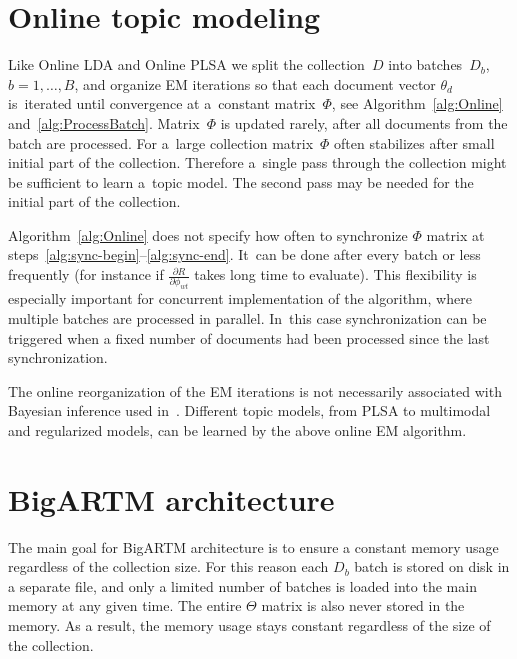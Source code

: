 \documentclass{sig-alternate}
\begin{document}
\section{Online topic modeling}
\label{sec:Online}

Like Online LDA \cite{hoffman10online} and Online PLSA \cite{bassiou14online}
we split the collection~$D$ into batches~$D_b$, ${b=1,\dots,B}$,
and organize EM iterations so that
each document vector $\theta_d$ is~iterated until convergence at a~constant matrix~$\Phi$,
see Algorithm~\ref{alg:Online} and~\ref{alg:ProcessBatch}.
Matrix~$\Phi$ is updated rarely, after all documents from the batch are processed.
For a~large collection
matrix~$\Phi$ often stabilizes after small initial part of the collection.
Therefore a~single pass through the collection might be sufficient to learn a~topic model.
The second pass may be needed for the initial part of the collection.

Algorithm~\ref{alg:Online} does not specify how often to synchronize $\Phi$ matrix
at steps~\ref{alg:sync-begin}--\ref{alg:sync-end}.
It~can be done after every batch or less frequently
(for instance if $\frac{\partial R}{\partial \phi_{wt}}$ takes long time to evaluate).
This flexibility is especially important for concurrent implementation of the algorithm,
where multiple batches are processed in parallel.
In~this case synchronization can be triggered when a fixed number of documents had been processed since the last synchronization.

The online reorganization of the EM iterations
is not necessarily associated with Bayesian inference used in~\cite{hoffman10online}.
Different topic models, from PLSA to multimodal and regularized models,
can be learned by the above online EM algorithm.

\section{BigARTM architecture}
\label{sec:BigARTM}
\nopagebreak
The main goal for BigARTM architecture is to ensure a constant memory usage regardless of the collection size.
For this reason each $D_b$ batch is stored on disk in a separate file,
and only a limited number of batches is loaded into the main memory at any given time.
The entire $\Theta$ matrix is also never stored in the memory.
As a result, the memory usage stays constant regardless of the size of the collection.
\end{document}
